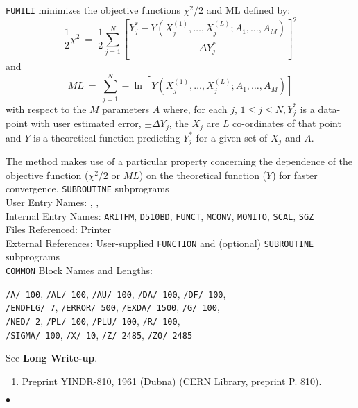                 
                
             
                 
\begin{center}
\end{center}
{\tt FUMILI} minimizes the objective functions $\chi^2/2 $
and ML defined by:
$$ \frac{1}{2}\chi^2 \ = \ \frac{1}{2} \sum_{j=1}^N \left[
\frac{Y_j^*-
Y(X_j^{(1)},\ldots,X_j^{(L)};A_1,\ldots,A_M)}
{\Delta Y_j^*}\right ]^2 $$
and
$$ ML \ = \ \sum_{j=1}^N -\ln[Y(X_j^{(1)},\ldots,X_j^{(L)};A_1,
\ldots,A_M)]$$
with respect to the $M$ parameters $A$ where, for each $j$,
$ 1\leq j\leq N, Y_j^*$ is a data-point with user estimated error,
$\pm\Delta Y_j$, the $ X_j $ are $L$ co-ordinates of that point and $Y$
is a theoretical function predicting $ Y_j^*$ for a given set of $X_j$
and $A$.
\par
The method makes use of a particular property concerning the
dependence of the objective function ($\chi^2/2$ or $ML$) on the
theoretical function ($Y$) for faster convergence.
\Structure
{\tt SUBROUTINE} subprograms \\
User Entry Names: , , \\
Internal Entry Names: {\tt ARITHM}, {\tt D510BD}, {\tt FUNCT},
{\tt MCONV}, {\tt MONITO}, {\tt SCAL}, {\tt SGZ}\\
Files Referenced: Printer  \\
External References: User-supplied  {\tt FUNCTION} and
(optional) {\tt SUBROUTINE} subprograms \\
{\tt COMMON} Block Names and Lengths: \parbox[t]{90mm}{
{\tt /A/ 100}, {\tt /AL/ 100}, {\tt /AU/ 100}, {\tt /DA/ 100},
{\tt /DF/ 100}, \\
{\tt /ENDFLG/ 7}, {\tt /ERROR/ 500}, {\tt /EXDA/ 1500}, {\tt /G/ 100},\\
{\tt /NED/ 2}, {\tt /PL/ 100}, {\tt /PLU/ 100}, {\tt /R/ 100}, \\
{\tt /SIGMA/ 100}, {\tt /X/ 10}, {\tt /Z/ 2485}, {\tt /Z0/ 2485}}
\Usage
See {\bf Long Write-up}.
\Refer
\begin{enumerate}
\item Preprint YINDR-810, 1961 (Dubna) (CERN Library, preprint P. 810).
\end{enumerate}
$\bullet$
